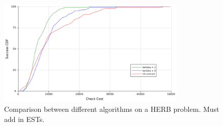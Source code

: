 \begin{figure}
   \centering
   \includegraphics[width=0.8\textwidth]{figs/timegreedy-herbstep1-comparison-cdfs.png}
   \caption{Comparison between different algorithms on a HERB problem.
      Must add in ESTs.}
   \label{fig:herb-comparison-cdfs}
\end{figure}

